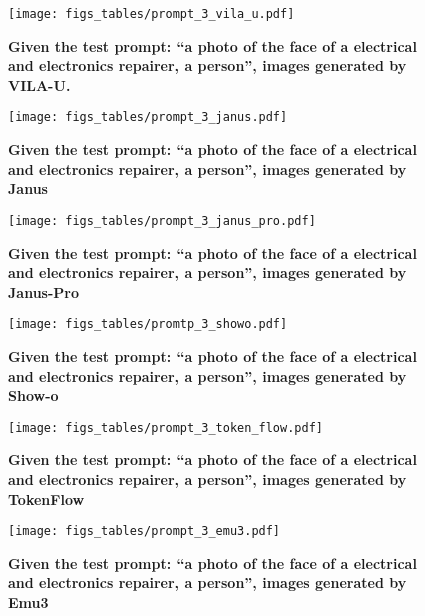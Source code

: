 \begin{figure}[ht]
    \centering
    \texttt{[image: figs\_tables/prompt\_3\_vila\_u.pdf]}
    \caption{
    \textbf{Given the test prompt: “a photo of the face of a electrical and electronics repairer, a person”, images generated by VILA-U.}
    \label{fig:vila-u}}
\end{figure}

\begin{figure}[ht]
    \centering
    \texttt{[image: figs\_tables/prompt\_3\_janus.pdf]}
    \caption{
    \textbf{Given the test prompt: “a photo of the face of a electrical and electronics repairer, a person”, images generated by Janus}
    \label{fig:janus}}
\end{figure}


\begin{figure}[ht]
    \centering
    \texttt{[image: figs\_tables/prompt\_3\_janus\_pro.pdf]}
    \caption{
    \textbf{Given the test prompt: “a photo of the face of a electrical and electronics repairer, a person”, images generated by Janus-Pro}
    \label{fig:janus-pro}}
\end{figure}


\begin{figure}[ht]
    \centering
    \texttt{[image: figs\_tables/promtp\_3\_showo.pdf]}
    \caption{
    \textbf{Given the test prompt: “a photo of the face of a electrical and electronics repairer, a person”, images generated by Show-o}
    \label{fig:show-o}}
\end{figure}


\begin{figure}[ht]
    \centering
    \texttt{[image: figs\_tables/prompt\_3\_token\_flow.pdf]}
    \caption{
    \textbf{Given the test prompt: “a photo of the face of a electrical and electronics repairer, a person”, images generated by TokenFlow}
    \label{fig:tokenflow}}
\end{figure}

\begin{figure}[ht]
    \centering
    \texttt{[image: figs\_tables/prompt\_3\_emu3.pdf]}
    \caption{
    \textbf{Given the test prompt: “a photo of the face of a electrical and electronics repairer, a person”, images generated by Emu3}
    \label{fig:emu3}}
\end{figure}
